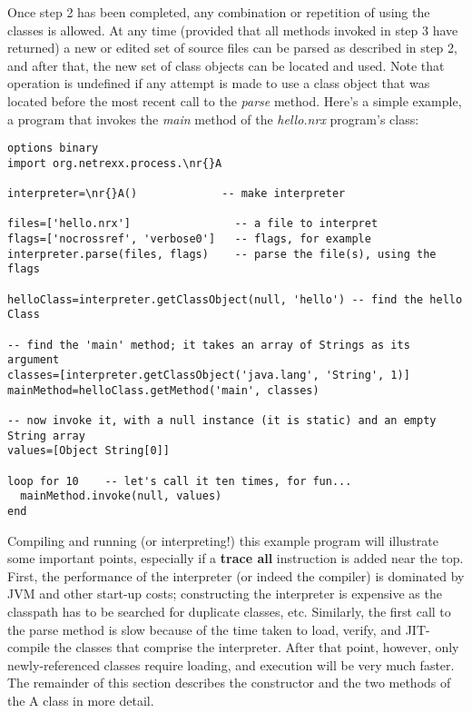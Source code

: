 Once step 2 has been completed, any combination or repetition of using
the classes is allowed.  At any time (provided that all methods invoked
in step 3 have returned) a new or edited set of source files can be
parsed as described in step 2, and after that, the new set of class
objects can be located and used.  Note that operation is undefined if
any attempt is made to use a class object that was located before the
most recent call to the \emph{parse} method.
\newline
Here's a simple example, a program that invokes the \emph{main} method
of the \emph{hello.nrx} program's class:
\begin{lstlisting}[label=netrexxa,caption=Try the \nr{}A interface]
options binary
import org.netrexx.process.\nr{}A

interpreter=\nr{}A()             -- make interpreter

files=['hello.nrx']                -- a file to interpret
flags=['nocrossref', 'verbose0']   -- flags, for example
interpreter.parse(files, flags)    -- parse the file(s), using the flags

helloClass=interpreter.getClassObject(null, 'hello') -- find the hello Class

-- find the 'main' method; it takes an array of Strings as its argument
classes=[interpreter.getClassObject('java.lang', 'String', 1)]
mainMethod=helloClass.getMethod('main', classes)

-- now invoke it, with a null instance (it is static) and an empty String array
values=[Object String[0]]

loop for 10    -- let's call it ten times, for fun...
  mainMethod.invoke(null, values)
end
\end{lstlisting}

Compiling and running (or interpreting!) this example program will
illustrate some important points, especially if a \textbf{trace all}
instruction is added near the top.  First, the performance of the
interpreter (or indeed the compiler) is dominated by JVM and other
start-up costs; constructing the interpreter is expensive as the
classpath has to be searched for duplicate classes, etc.  Similarly,
the first call to the parse method is slow because of the time taken to
load, verify, and JIT-compile the classes that comprise the interpreter.
After that point, however, only newly-referenced classes require
loading, and execution will be very much faster.
\newline
The remainder of this section describes the constructor and the two
methods of the \nr{}A class in more detail.
